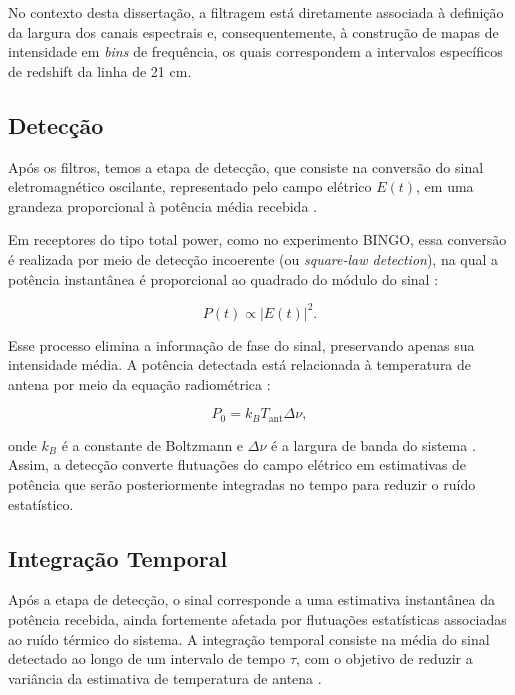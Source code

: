 No contexto desta dissertação, a filtragem está diretamente associada à definição da largura dos canais espectrais e, consequentemente, à construção de mapas de intensidade em \textit{bins} de frequência, os quais correspondem a intervalos específicos de redshift da linha de 21 cm.

\subsection{Detecção}

Após os filtros, temos a etapa de detecção, que consiste na conversão do sinal eletromagnético oscilante, representado pelo campo elétrico $E(t)$, em uma grandeza proporcional à potência média recebida \cite{Vieira2020}.

Em receptores do tipo total power, como no experimento BINGO, essa conversão é realizada por meio de detecção incoerente (ou \textit{square-law detection}), na qual a potência instantânea é proporcional ao quadrado do módulo do sinal \cite{burke2019introduction}:

\begin{equation}
P(t) \propto |E(t)|^2.
\end{equation}

Esse processo elimina a informação de fase do sinal, preservando apenas sua intensidade média. A potência detectada está relacionada à temperatura de antena por meio da equação radiométrica \cite{Daniyan2011, Balanis2005}:


\begin{equation}
P_0 = k_B T_{\mathrm{ant}} \Delta \nu,
\label{potencia-de-ruido}
\end{equation}

onde $k_B$ é a constante de Boltzmann e $\Delta \nu$ é a largura de banda do sistema \cite{Daniyan2011, Balanis2005}. Assim, a detecção converte flutuações do campo elétrico em estimativas de potência que serão posteriormente integradas no tempo para reduzir o ruído estatístico.

\subsection{Integração Temporal}

Após a etapa de detecção, o sinal corresponde a uma estimativa instantânea da potência recebida, ainda fortemente afetada por flutuações estatísticas associadas ao ruído térmico do sistema. A integração temporal consiste na média do sinal detectado ao longo de um intervalo de tempo $\tau$, com o objetivo de reduzir a variância da estimativa de temperatura de antena \cite{burke2019introduction}.

